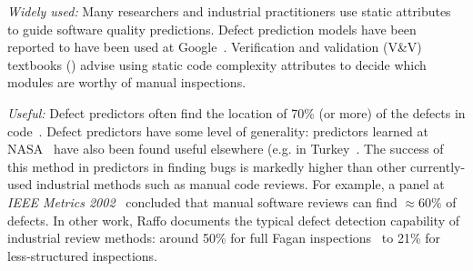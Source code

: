 {\em Widely used:} Many researchers and industrial practitioners  use static attributes to guide software 
quality predictions.
 Defect prediction models have been reported
to have been used at Google~\cite{lewis13}.
Verification and validation (V\&V) textbooks
(\cite{rakitin01}) advise using static code complexity attributes
to decide which modules are worthy of manual inspections.  


{\em Useful:}
Defect predictors often  find the location of  70\% (or more)
of the defects in code~\cite{me07b}.
Defect predictors have some level of generality:
predictors learned at NASA~\cite{me07b} have also been found useful elsewhere
(e.g. in Turkey~\cite{tosun10,tosun09}.
The success of this method in  predictors in finding bugs is   markedly
higher than other currently-used
industrial
methods such as manual code reviews. For example, 
a  panel at {\em IEEE Metrics
2002}~\cite{shu02} concluded that manual software  reviews can find ${\approx}60\%$ 
of defects.
In other work, 
Raffo documents the typical    defect detection capability of
industrial review methods:   around 50\%
 for full Fagan inspections~\cite{fagan76} to
21\% for less-structured inspections.

